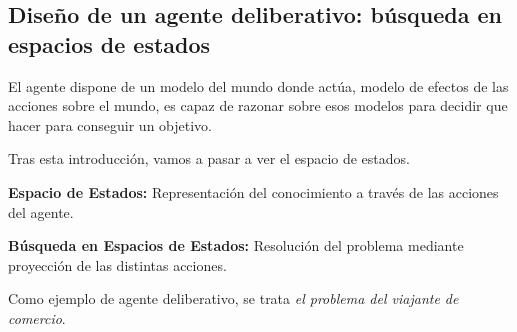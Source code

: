 \subsection{Diseño de un agente deliberativo: búsqueda en espacios de estados}

El agente dispone de un modelo del mundo donde actúa, modelo de efectos de las acciones sobre el mundo, es capaz de razonar sobre esos modelos para decidir que hacer para conseguir un objetivo.


Tras esta introducción, vamos a pasar a ver el espacio de estados.

\textbf{Espacio de Estados: } Representación del
conocimiento a través de las acciones del
agente.

\textbf{Búsqueda en Espacios de Estados: } Resolución del problema mediante proyección
de las distintas acciones.

Como ejemplo de agente deliberativo, se trata \textit{el problema del viajante de comercio}.